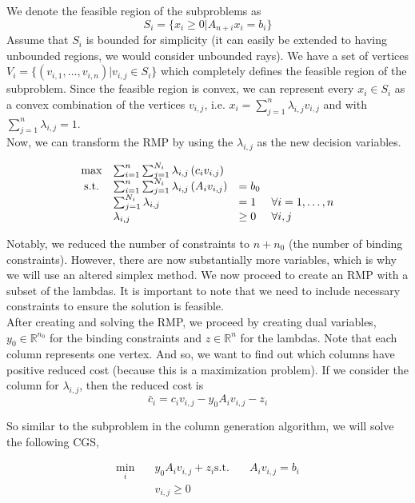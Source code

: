 \documentclass[11pt]{article}
\begin{document}
\noindent We denote the feasible region of the subproblems as 
$$S_i = \{x_i \geq 0 | A_{n+i} x_i = b_i\}$$
\noindent Assume that $S_i$ is bounded for simplicity (it can easily be extended to having unbounded regions, we would consider unbounded rays). We have a set of vertices $V_i = \{(v_{i,1}, \ldots, v_{i,n}) | v_{i,j} \in S_i\}$ which completely defines the feasible region of the subproblem. Since the feasible region is convex, we can represent every $x_i \in S_i$ as a convex combination of the vertices $v_{i,j}$, i.e. $x_i = \sum_{j=1}^{n} \lambda_{i,j} v_{i,j}$ and with $\sum_{j=1}^{n} \lambda_{i,j} = 1$.
\\

\noindent Now, we can transform the RMP by using the $\lambda_{i,j}$ as the new decision variables.

$$
\begin{array}{clll}
    \max & \sum_{i=1}^n \sum_{j=1}^{N_i} \lambda_{i, j}\left(c_i v_{i, j}\right) & & \\
    \mathrm{s.t.} & \sum_{i=1}^n \sum_{j=1}^{N_i} \lambda_{i, j}\left(A_{i} v_{i, j}\right) & =b_0 & \\
    & \sum_{j=1}^{N_i} \lambda_{i, j} & =1 & \forall i=1,\ldots, n \\
    & \lambda_{i, j} & \geq 0 & \forall i, j
\end{array}\\
$$

\noindent Notably, we reduced the number of constraints to $n + n_0$ (the number of binding constraints). However, there are now substantially more variables, which is why we will use an altered simplex method. We now proceed to create an RMP with a subset of the lambdas. It is important to note that we need to include necessary constraints to ensure the solution is feasible.
\\

\noindent After creating and solving the RMP, we proceed by creating dual variables, $y_0 \in \mathbb{R}^{n_0}$ for the binding constraints and $z \in \mathbb{R}^{n}$ for the lambdas. Note that each column represents one vertex. And so, we want to find out which columns have positive reduced cost (because this is a maximization problem). If we consider the column for $\lambda_{i, j}$, then the reduced cost is 
$$ \bar{c}_i = c_i v_{i, j} - y_0 A_{i} v_{i, j} - z_i $$

\noindent So similar to the subproblem in the column generation algorithm, we will solve the following CGS, 

$$
\begin{aligned}
    \min_i \quad & y_0 A_{i} v_{i, j} + z_i 
    \text{s.t.} \quad & A_{i} v_{i, j} = b_i \\
    & v_{i, j} \geq 0
\end{aligned}
$$
\end{document}
